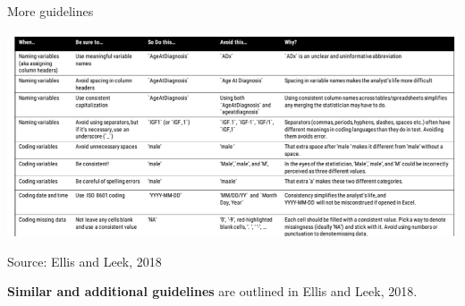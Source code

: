 \documentclass[ignorenonframetext,]{beamer}
\begin{document}
\begin{frame}{More guidelines}
\protect\hypertarget{more-guidelines}{}

\begin{center}\includegraphics[width=\textwidth]{figures/when_be_sure_to} \end{center}

\vspace{-0.4cm}

\scriptsize Source: Ellis and Leek, 2018

\normalsize \textbf{Similar and additional guidelines} are outlined in
Ellis and Leek, 2018.

\end{frame}
\end{document}
